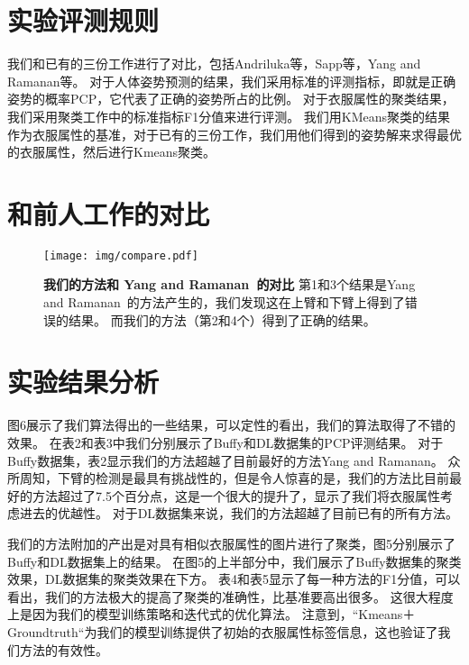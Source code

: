 \section{实验评测规则}
我们和已有的三份工作进行了对比，包括Andriluka等\cite{}，Sapp等\cite{}，Yang and Ramanan等\cite{}。
对于人体姿势预测的结果，我们采用标准的评测指标，即就是正确姿势的概率PCP，它代表了正确的姿势所占的比例。
对于衣服属性的聚类结果，我们采用聚类工作中的标准指标F1分值来进行评测。
我们用KMeans聚类的结果作为衣服属性的基准，对于已有的三份工作，我们用他们得到的姿势解来求得最优的衣服属性，然后进行Kmeans聚类。

\section{和前人工作的对比}

\begin{figure}[tbp]
\centering
\texttt{[image: img/compare.pdf]}
\caption{ \textbf{我们的方法和 Yang and Ramanan~\cite{deva11}的对比 }
第1和3个结果是Yang and Ramanan~\cite{deva11}的方法产生的，我们发现这在上臂和下臂上得到了错误的结果。
而我们的方法（第2和4个）得到了正确的结果。}
\label{fig:compare}
\end{figure}

\section{实验结果分析}
图6展示了我们算法得出的一些结果，可以定性的看出，我们的算法取得了不错的效果。
在表2和表3中我们分别展示了Buffy和DL数据集的PCP评测结果。
对于Buffy数据集，表2显示我们的方法超越了目前最好的方法Yang and Ramanan\cite{}。
众所周知，下臂的检测是最具有挑战性的，但是令人惊喜的是，我们的方法比目前最好的方法超过了7.5个百分点，这是一个很大的提升了，显示了我们将衣服属性考虑进去的优越性。
对于DL数据集来说，我们的方法超越了目前已有的所有方法。

我们的方法附加的产出是对具有相似衣服属性的图片进行了聚类，图5分别展示了Buffy和DL数据集上的结果。
在图5的上半部分中，我们展示了Buffy数据集的聚类效果，DL数据集的聚类效果在下方。
表4和表5显示了每一种方法的F1分值，可以看出，我们的方法极大的提高了聚类的准确性，比基准要高出很多。
这很大程度上是因为我们的模型训练策略和迭代式的优化算法。
注意到，“Kmeans＋Groundtruth“为我们的模型训练提供了初始的衣服属性标签信息，这也验证了我们方法的有效性。

